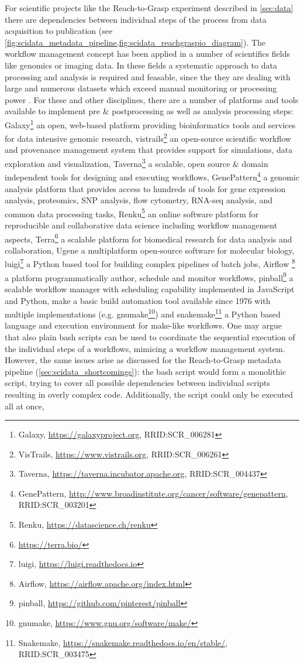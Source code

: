 For scientific projects like the Reach-to-Grasp experiment described in \cref{sec:data} there are dependencies between individual steps of the process from data acquisition to publication (see \cref{fig:scidata_metadata_pipeline,fig:scidata_reachgraspio_diagram}). The workflow management concept has been applied in a number of scientifics fields like genomics or imaging data. In these fields a systematic approach to data processing and analysis is required and feasable, since the they are dealing with large and numerous datasets which exceed manual monitoring or processing power \citep[e.g.][]{Palm_2010}.
For these and other disciplines, there are a number of platforms and tools available to implement pre \& postprocessing as well as analysis processing steps: Galaxy\footnote{Galaxy, \url{https://galaxyproject.org}, RRID:SCR\_006281} an  open, web-based platform providing bioinformatics tools and services for data intensive genomic research, vistrails\footnote{VisTrails, \url{https://www.vistrails.org}, RRID:SCR\_006261} an open-source scientific workflow and provenance management system that provides support for simulations, data exploration and visualization, Taverna\footnote{Taverna, \url{https://taverna.incubator.apache.org}, RRID:SCR\_004437} a scalable, open source \& domain independent tools for designing and executing workflows,  GenePattern\footnote{GenePattern, \url{http://www.broadinstitute.org/cancer/software/genepattern}, RRID:SCR\_003201} a genomic analysis platform that provides access to hundreds of tools for gene expression analysis, proteomics, SNP analysis, flow cytometry, RNA-seq analysis, and common data processing tasks, Renku\footnote{Renku, \url{https://datascience.ch/renku}} an online software platform for reproducible and collaborative data science including workflow management aspects, Terra\footnote{\url{https://terra.bio/}} a scalable platform  for biomedical research for data analysis and collaboration, Ugene \citep{Okonechnikov_2012} a multiplatform open-source software for molecular biology, luigi\footnote{luigi, \url{https://luigi.readthedocs.io}} a Python based tool for building complex pipelines of batch jobs, Airflow \footnote{Airflow, \url{https://airflow.apache.org/index.html}} a platform programmatically author, schedule and monitor workflows, pinball\footnote{pinball, \url{https://github.com/pinterest/pinball}} a scalable workflow manager with scheduling capability implemented in JavaScript and Python, make a basic build automation tool available since 1976 with multiple implementations (e.g. gnumake\footnote{gnumake, \url{https://www.gnu.org/software/make/}}) and snakemake\footnote{Snakemake, \url{https://snakemake.readthedocs.io/en/stable/}, RRID:SCR\_003475} a Python based language and execution environment for make-like workflows. One may argue that also plain bash scripts can be used to coordinate the sequential execution of the individual steps of a workflows, mimicing a workflow management system. However, the same issues arise as discussed for the Reach-to-Grasp metadata pipeline (\cref{sec:scidata_shortcomings}): the bash script would form a monolithic script, trying to cover all possible dependencies between individual scripts resulting in overly complex code. Additionally, the script could only be executed all at once, 